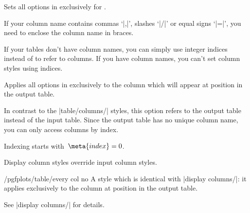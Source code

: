 \begin{pgfplotstablecolumnkey}
	Sets all options in  exclusively for .

\begin{codeexample}[]
\end{codeexample}
	If your column name contains commas `|,|', slashes `|/|' or equal signs `|=|', you need to enclose the column name in braces.
\begin{codeexample}[narrow]
\end{codeexample}
	If your tables don't have column names, you can simply use integer indices instead of  to refer to columns. If you have column names, you can't set column styles using indices.
\end{pgfplotstablecolumnkey}

\begin{pgfplotstabledisplaycolumnkey}
	Applies all options in  exclusively to the column which will appear at position  in the output table.

	In contrast to the |table/columns/| styles, this option refers to the output table instead of the input table. Since the output table has no unique column name, you can only access columns by index.

	Indexing starts with~$\meta{index}=0$.

	Display column styles override input column styles.
\end{pgfplotstabledisplaycolumnkey}

\begin{stylekey}{/pgfplots/table/every col no }
	A style which is identical with |display columns/|: it applies exclusively to the column at position  in the output table.

	See |display columns/| for details.
\end{stylekey}


